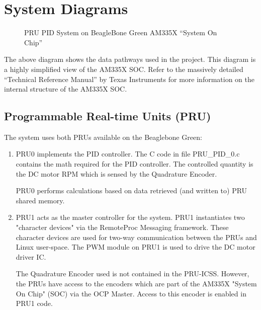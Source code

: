 %
%
%

\chapter{System Diagrams}

\begin{figure}[H]
	\centering
	\centering\bfseries
	\caption{PRU PID System on BeagleBone Green AM335X ``System On Chip''}
\end{figure}

The above diagram shows the data pathways used in the project.  This diagram is a highly simplified view of the AM335X SOC.  Refer to the massively detailed ``Technical Reference Manual'' by Texas Instruments for more information on the internal structure of the AM335X SOC.

\section{Programmable Real-time Units (PRU)}

The system uses both PRUs available on the Beaglebone Green:

\begin{enumerate}
\item 

PRU0 implements the PID controller.  The C code in file PRU\_PID\_0.c contains
the math required for the PID controller.  The controlled quantity is the DC motor RPM which is sensed by the Quadrature Encoder.

PRU0 performs calculations based on data retrieved (and written to) PRU shared memory.
\item 
PRU1 acts as the master controller for the system.  PRU1 instantiates two "character devices" via the RemoteProc Messaging framework.  These character devices are used for two-way communication between the PRUs and Linux user-space.  The PWM module on PRU1 is used to drive the DC motor driver IC.

The Quadrature Encoder used is not contained in the PRU-ICSS.  However, the PRUs have access to the encoders which are part of the AM335X "System On Chip" (SOC) via the OCP Master.  Access to this encoder is enabled in PRU1 code.
\end{enumerate}

